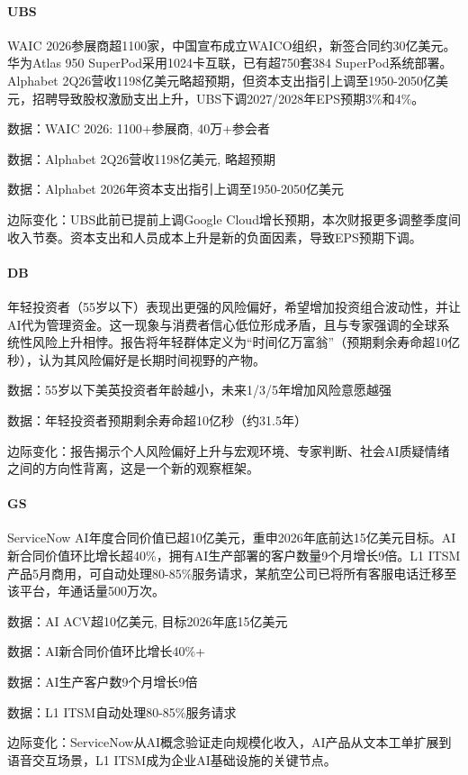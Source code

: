 \documentclass[11pt]{ctexart}
\begin{document}
\paragraph{UBS} WAIC 2026参展商超1100家，中国宣布成立WAICO组织，新签合同约30亿美元。华为Atlas 950 SuperPod采用1024卡互联，已有超750套384 SuperPod系统部署。Alphabet 2Q26营收1198亿美元略超预期，但资本支出指引上调至1950-2050亿美元，招聘导致股权激励支出上升，UBS下调2027/2028年EPS预期3\%和4\%。
{\small\color{refgray}数据：WAIC 2026: 1100+参展商, 40万+参会者\par}
{\small\color{refgray}数据：Alphabet 2Q26营收1198亿美元, 略超预期\par}
{\small\color{refgray}数据：Alphabet 2026年资本支出指引上调至1950-2050亿美元\par}
{\small\color{refgray}边际变化：UBS此前已提前上调Google Cloud增长预期，本次财报更多调整季度间收入节奏。资本支出和人员成本上升是新的负面因素，导致EPS预期下调。\par}
\paragraph{DB} 年轻投资者（55岁以下）表现出更强的风险偏好，希望增加投资组合波动性，并让AI代为管理资金。这一现象与消费者信心低位形成矛盾，且与专家强调的全球系统性风险上升相悖。报告将年轻群体定义为“时间亿万富翁”（预期剩余寿命超10亿秒），认为其风险偏好是长期时间视野的产物。
{\small\color{refgray}数据：55岁以下美英投资者年龄越小，未来1/3/5年增加风险意愿越强\par}
{\small\color{refgray}数据：年轻投资者预期剩余寿命超10亿秒（约31.5年）\par}
{\small\color{refgray}边际变化：报告揭示个人风险偏好上升与宏观环境、专家判断、社会AI质疑情绪之间的方向性背离，这是一个新的观察框架。\par}
\paragraph{GS} ServiceNow AI年度合同价值已超10亿美元，重申2026年底前达15亿美元目标。AI新合同价值环比增长超40\%，拥有AI生产部署的客户数量9个月增长9倍。L1 ITSM产品5月商用，可自动处理80-85\%服务请求，某航空公司已将所有客服电话迁移至该平台，年通话量500万次。
{\small\color{refgray}数据：AI ACV超10亿美元, 目标2026年底15亿美元\par}
{\small\color{refgray}数据：AI新合同价值环比增长40\%+\par}
{\small\color{refgray}数据：AI生产客户数9个月增长9倍\par}
{\small\color{refgray}数据：L1 ITSM自动处理80-85\%服务请求\par}
{\small\color{refgray}边际变化：ServiceNow从AI概念验证走向规模化收入，AI产品从文本工单扩展到语音交互场景，L1 ITSM成为企业AI基础设施的关键节点。\par}
\end{document}
